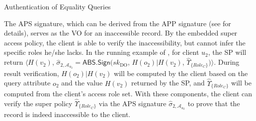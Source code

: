 \begin{algorithm}[t]
  \caption{Authentication of Equality Queries}\label{alg:access-control:equality-query}
\end{algorithm}

The APS signature, which can be derived from the APP signature (see  for details), serves as the VO for an inaccessible record. %
By the embedded super access policy, the client is able to verify the inaccessibility, but cannot infer  the specific roles he/she lacks.
In the running example of , for client $u_2$, the SP will return $\langle H(v_2)$, $\hat{\sigma}_{2, \mathcal{A}_{u_2}} = \textsf{ABS.Sign}({sk}_\text{DO}$, $H(o_2) | H(v_2)$, $\hat{\Upsilon}_{\{{Role}_C \}})\rangle$. During  result verification, $H(o_2) | H(v_2)$ will be computed by the client based on the query attribute $o_2$ and the value $H(v_2)$ returned by the SP, and $\hat{\Upsilon}_{\{{Role}_C \}}$ will be computed from the client's access role set. With these components, the client can verify the super policy $\hat{\Upsilon}_{\{{Role}_C \}}$ via the APS signature $\hat{\sigma}_{2, \mathcal{A}_{u_2}}$ to prove that the record is indeed inaccessible to the client. %

